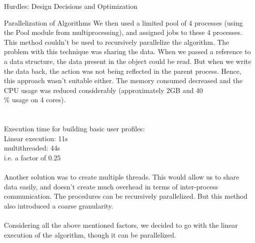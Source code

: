 \documentclass{report}
\begin{document}
\begin{projChapter}{Hurdles: Design Decisions and Optimization}
\begin{projSection}{Parallelization of Algorithms}
            We then used a limited pool of 4 processes (using the Pool module from multiprocessing), and assigned jobs to these 4 processes. This method couldn't be used to recursively parallelize the algorithm. The problem with this technique was sharing the data. When we passed a reference to a data structure, the data present in the object could be read. But when we write the data back, the action was not being reflected in the parent process. Hence, this approach wasn't suitable either. The memory consumed decreased and the CPU usage was reduced considerably (approximately 2GB and 40\\\% usage on 4 cores).
            ~\\\\~\\
            Execution time for building basic user profiles: 
            ~\\
            Linear execution: 11s
            ~\\
            multithreaded: 44s
            ~\\
            i.e. a factor of 0.25
            ~\\\\
            Another solution was to create multiple threads. This would allow us to share data easily, and doesn't create much overhead in terms of inter-process communication. The procedures can be recursively parallelized. But this method also introduced a coarse granularity. 
            ~\\\\
            Considering all the above mentioned factors, we decided to go with the linear execution of the algorithm, though it can be parallelized.
        \end{projSection}
\end{projChapter}
\end{document}
